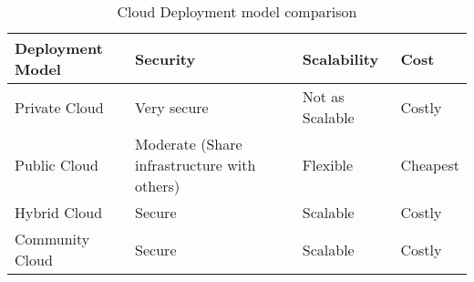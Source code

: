 \begingroup
\centering
\setlength{\tabcolsep}{6.5pt} %
\renewcommand{\arraystretch}{1.8} %
\begin{longtable}{ |p{3cm}| p{4cm} |p{3cm} |p{5cm} |}
\caption{Cloud Deployment model comparison}
    \label{table:cloud_comp}
\hline
\rowcolor{grey!15}
\textbf{Deployment Model}  & \textbf{Security} & \textbf{Scalability}& \textbf{Cost}\\
\hline
Private Cloud &  
\vspace{-\baselineskip}
Very secure & Not as Scalable & Costly\\
\hline
Public Cloud &  
Moderate (Share infrastructure with others) & Flexible & Cheapest\\
\hline
Hybrid Cloud &  
\vspace{-\baselineskip}
Secure & Scalable & Costly\\
\hline
Community Cloud &  
\vspace{-\baselineskip}
Secure & Scalable & Costly\\
\hline
\end{longtable}
\endgroup